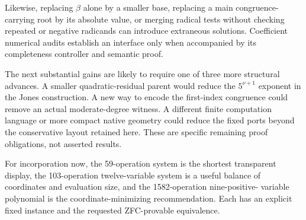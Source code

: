 Likewise, replacing $\beta$ alone by a smaller base, replacing a main
congruence-carrying root by its absolute value, or merging radical tests
without checking repeated or negative radicands can introduce extraneous
solutions. Coefficient numerical audits establish an interface only when
accompanied by its completeness controller and semantic proof.

The next substantial gains are likely to require one of three more
structural advances. A smaller quadratic-residual parent would reduce the
$5^{\nu+1}$ exponent in the Jones construction. A new way to encode the
first-index congruence could remove an actual moderate-degree witness.
A different finite computation language or more compact native geometry
could reduce the fixed ports beyond the conservative layout retained here.
These are specific remaining proof obligations, not asserted results.

For incorporation now, the 59-operation system is the shortest transparent
display, the 103-operation twelve-variable system is a useful balance of
coordinates and evaluation size, and the 1582-operation nine-positive-
variable polynomial is the coordinate-minimizing recommendation. Each has
an explicit fixed instance and the requested ZFC-provable equivalence.

